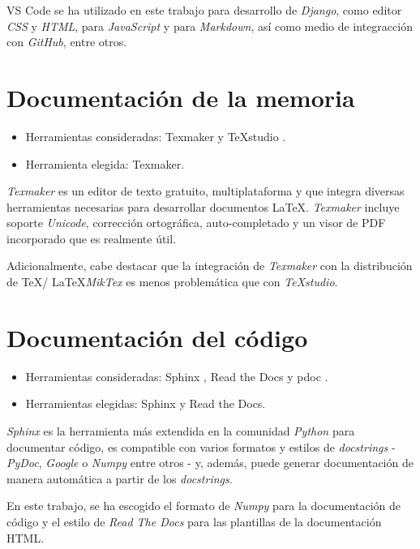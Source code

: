 VS Code se ha utilizado en este trabajo para desarrollo de \emph{Django}, como editor 
\emph{CSS} y \emph{HTML}, para \emph{JavaScript} y para \emph{Markdown}, así como medio de integracción con \emph{GitHub}, entre otros. 


\section{Documentación de la memoria}\label{editor_texto}

\begin{itemize}
\tightlist
\item
  Herramientas consideradas: Texmaker \citep{online:texmaker} y TeXstudio \citep{online:texstudio}.
\item
  Herramienta elegida: Texmaker. 
\end{itemize}

\emph{Texmaker} es un editor de texto gratuito, multiplataforma y que integra diversas
herramientas necesarias para desarrollar documentos \LaTeX. \emph{Texmaker} incluye soporte 
\emph{Unicode}, corrección ortográfica, auto-completado y un visor de PDF incorporado que es
realmente útil. 

Adicionalmente, cabe destacar que la integración de \emph{Texmaker} con la distribución 
de \TeX / \LaTeX \emph{MikTex} \citep{wiki:miktex} es menos problemática que con \emph{TeXstudio}. 


\section{Documentación del código}\label{editor_texto}

\begin{itemize}
\tightlist
\item
  Herramientas consideradas: Sphinx \citep{online:sphinx}, Read the Docs \citep{online:readthedocs} y pdoc \citep{online:pdoc}.
\item
  Herramientas elegidas: Sphinx y Read the Docs. 
\end{itemize}

\emph{Sphinx} es la herramienta más extendida en la comunidad \emph{Python} para documentar código,
es compatible con varios formatos y estilos de \emph{docstrings} - \emph{PyDoc}, \emph{Google} o \emph{Numpy} entre otros - y, además, puede generar documentación de manera automática a partir de los \emph{docstrings}. 

En este trabajo, se ha escogido el formato de \emph{Numpy} para la documentación de código y el estilo de \emph{Read The Docs} para las plantillas de la documentación HTML.

